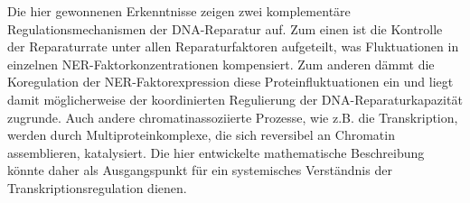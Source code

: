 Die hier gewonnenen Erkenntnisse zeigen zwei komplement\"{a}re Regulationsmechanismen der DNA-Reparatur auf. Zum einen ist die Kontrolle der Reparaturrate unter allen Reparaturfaktoren aufgeteilt, was Fluktuationen in einzelnen NER-Faktorkonzentrationen kompensiert. Zum anderen d\"{a}mmt die Koregulation der NER-Faktorexpression diese Proteinfluktuationen ein und liegt damit m\"{o}glicherweise der koordinierten Regulierung der DNA-Reparaturkapazit\"{a}t zugrunde. Auch andere chromatinassoziierte Prozesse, wie z.B. die Transkription, werden durch Multiproteinkomplexe, die sich reversibel an Chromatin assemblieren, katalysiert. Die hier entwickelte mathematische Beschreibung k\"{o}nnte daher als Ausgangspunkt f\"{u}r ein systemisches Verst\"{a}ndnis der Transkriptionsregulation dienen.




  





